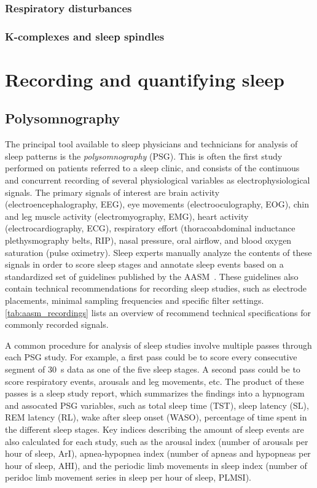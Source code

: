             \subsubsection{Respiratory disturbances}
            \subsubsection{K-complexes and sleep spindles}
                \citep{Cash2009, Gennaro2003, Forget2011}
    \section{Recording and quantifying sleep}\label{sec:recording-quantifying-sleep}
        \cite{Berry2020}
        \subsection{Polysomnography}\label{sec:polysomnography}
            The principal tool available to sleep physicians and technicians for analysis of sleep patterns is the \textit{polysomnography} (PSG).
            This is often the first study performed on patients referred to a sleep clinic, and consists of the continuous and concurrent recording of several physiological variables as electrophysiological signals.
            The primary signals of interest are brain activity (electroencephalography, EEG), eye movements (electrooculography, EOG), chin and leg muscle activity (electromyography, EMG), heart activity (electrocardiography, ECG), respiratory effort (thoracoabdominal inductance plethysmography belts, RIP), nasal pressure, oral airflow, and blood oxygen saturation (pulse oximetry).
            Sleep experts manually analyze the contents of these signals in order to score sleep stages and annotate sleep events based on a standardized set of guidelines published by the \ac{AASM}~\cite{AASM2014}. 
            These guidelines also contain technical recommendations for recording sleep studies, such as electrode placements, minimal sampling frequencies and specific filter settings. \cref{tab:aasm_recordings} lists an overview of recommend technical specifications for commonly recorded signals.
            
            A common procedure for analysis of sleep studies involve multiple passes through each PSG study.
            For example, a first pass could be to score every consecutive segment of \SI{30}{\second} data as one of the five sleep stages.
            A second pass could be to score respiratory events, arousals and leg movements, etc. 
            The product of these passes is a sleep study report, which summarizes the findings into a hypnogram and assocated PSG variables, such as total sleep time (TST), sleep latency (SL), REM latency (RL), wake after sleep onset (WASO), percentage of time spent in the different sleep stages.
            Key indices describing the amount of sleep events are also calculated for each study, such as the arousal index (number of arousals per hour of sleep, ArI), apnea-hypopnea index (number of apneas and hypopneas per hour of sleep, AHI), and the periodic limb movements in sleep index (number of peridoc limb movement series in sleep per hour of sleep, PLMSI). 

